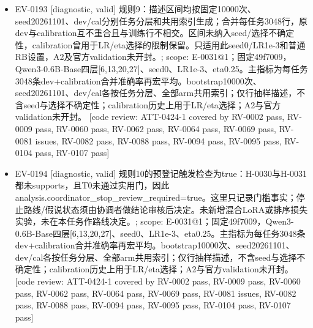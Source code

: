 \documentclass[11pt]{article}
\begin{document}
\begin{itemize}
\item EV-0193 [diagnostic, valid] 规则9：描述区间均按固定10000次、seed20261101、dev/cal分别任务分层和共用索引生成；合并每任务3048行，原dev与calibration互不重合且与训练行不相交。区间未纳入seed/选择不确定性，calibration曾用于LR/eta选择的限制保留。只适用此seed0/LR1e-3和普通RB设置，A2及官方validation未开封。; scope: E-0031@1；固定49f7009，Qwen3-0.6B-Base四层[6,13,20,27]、seed0、LR1e-3、eta0.25。主指标为每任务3048条dev+calibration合并准确率再宏平均。bootstrap10000次、seed20261101、dev/cal各按任务分层、全部arm共用索引；仅行抽样描述，不含seed与选择不确定性；calibration历史上用于LR/eta选择；A2与官方validation未开封。 [code review: ATT-0424-1 covered by RV-0002 pass, RV-0009 pass, RV-0060 pass, RV-0062 pass, RV-0064 pass, RV-0069 pass, RV-0081 issues, RV-0082 pass, RV-0088 pass, RV-0094 pass, RV-0095 pass, RV-0104 pass, RV-0107 pass]
\item EV-0194 [diagnostic, valid] 规则10的预登记触发检查为true：H-0030与H-0031都未supports，且T0未通过实用门，因此analysis.coordinator\_stop\_review\_required=true。这里只记录门槛事实；停止路线/假说状态须由协调者做结论审核后决定。未新增混合LoRA或排序损失实验，未在本任务作路线决定。; scope: E-0031@1；固定49f7009，Qwen3-0.6B-Base四层[6,13,20,27]、seed0、LR1e-3、eta0.25。主指标为每任务3048条dev+calibration合并准确率再宏平均。bootstrap10000次、seed20261101、dev/cal各按任务分层、全部arm共用索引；仅行抽样描述，不含seed与选择不确定性；calibration历史上用于LR/eta选择；A2与官方validation未开封。 [code review: ATT-0424-1 covered by RV-0002 pass, RV-0009 pass, RV-0060 pass, RV-0062 pass, RV-0064 pass, RV-0069 pass, RV-0081 issues, RV-0082 pass, RV-0088 pass, RV-0094 pass, RV-0095 pass, RV-0104 pass, RV-0107 pass]

\end{itemize}
\end{document}
